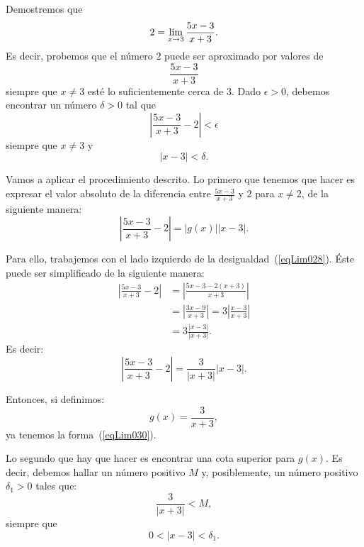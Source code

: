 \begin{exemplo}[Solución]{Demostremos que
\[
2 = \limjc{\frac{5x - 3}{x + 3}.}{x}{3}
\]
Es decir, probemos que el número $2$ puede ser aproximado por valores de
\[
\frac{5x - 3}{x + 3}
\]
siempre que $x\neq 3$ esté lo suficientemente cerca de $3$.} Dado $\epsilon > 0$, debemos encontrar
un número $\delta > 0$ tal que
\begin{equation}
\label{eqLim028}
\left|\frac{5x-3}{x+3} - 2\right| < \epsilon
\end{equation}
siempre que $x\neq 3$ y
\begin{equation}
\label{eqLim029}
|x - 3| < \delta.
\end{equation}

Vamos a aplicar el procedimiento descrito. Lo primero que tenemos que hacer es expresar el valor
absoluto de la diferencia entre $\frac{5x-3}{x+3}$ y $2$ para $x\neq 2$, de la siguiente manera:
\begin{equation}
\label{eqLim030}
\left|\frac{5x-3}{x+3} - 2\right| = |g(x)||x - 3|.
\end{equation}

Para ello, trabajemos con el lado izquierdo de la desigualdad~(\ref{eqLim028}). Éste puede ser
simplificado de la siguiente manera:
\begin{align*}
\left|\frac{5x-3}{x+3} - 2\right| &= \left|\frac{5x-3 - 2(x+3)}{x+3}\right| \\
&= \left|\frac{3x-9}{x+3}\right| = 3\left|\frac{x-3}{x+3}\right|\\
&= 3\frac{|x-3|}{|x+3|}.
\end{align*}
Es decir:
\begin{equation}
\label{eqLim036}
\left|\frac{5x-3}{x+3} - 2\right| = \frac{3}{|x+3|}|x-3|.
\end{equation}

Entonces, si definimos:
\[
g(x) = \frac{3}{x+3},
\]
ya tenemos la forma~(\ref{eqLim030}).

Lo segundo que hay que hacer es encontrar una cota superior para $g(x)$. Es decir, debemos hallar
un número positivo $M$ y, posiblemente, un número positivo $\delta_1 > 0$ tales que:
\begin{equation}
\label{eqLim033}
\frac{3}{|x + 3|} < M,
\end{equation}
siempre que
\begin{equation*}
0 < |x - 3| < \delta_1.
\end{equation*}


\end{exemplo}
